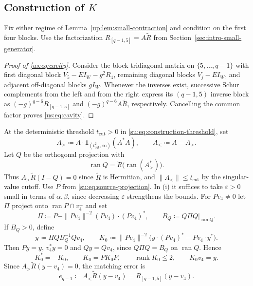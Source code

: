 \documentclass[11pt]{article}
\numberwithin{equation}{section}
\theoremstyle{remark}
\newcommand{\rank}{\operatorname{rank}}
\newcommand{\ran}{\operatorname{ran}}
\begin{document}
\subsection{Construction of \texorpdfstring{$K$}{K}}
\label{su:sec:generator-choice}
\label{su:sec:explicit-generator}

Fix either regime of Lemma~\ref{up:lem:small-contraction} and condition on
the first four blocks. Use the factorization
$R_{[q-1,5]}=A\widetilde R$ from Section~\ref{sec:intro-small-generator}.

\begin{proof}[Proof of \eqref{us:eq:cavity}]
Consider the block tridiagonal matrix on $\{5,\ldots,q-1\}$
with first diagonal block $V_5-EI_W-g^2R_4$, remaining diagonal
blocks $V_j-EI_W$, and adjacent off-diagonal blocks $gI_W$.
Whenever the inverses exist, successive Schur complements from
the left and from the right express its $(q-1,5)$ inverse block
as $(-g)^{q-6}R_{[q-1,5]}$ and
$(-g)^{q-6}A\widetilde R$, respectively.
Cancelling the common factor proves \eqref{us:eq:cavity}.
\end{proof}
At the deterministic threshold $t_{\mathrm{cut}}>0$ in
\eqref{su:eq:construction-threshold}, set
\[
 A_>\coloneqq A\cdot\mathbf1_{(t_{\mathrm{cut}}^2,\infty)}(A^*A),\qquad
 A_<\coloneqq A-A_>.
\]
Let $Q$ be the orthogonal projection with
\begin{equation}\label{su:eq:retained-projection}
 \ran Q=\widetilde R\bigl(\ran(A_>^*)\bigr).
\end{equation}
Thus $A_>\widetilde R(I-Q)=0$ since $\widetilde R$ is Hermitian,
and $\|A_<\|\le t_{\mathrm{cut}}$ by the singular-value cutoff.
Use $P$ from \eqref{su:eq:source-projection}.
In (i) it suffices to take $\varepsilon>0$ small in terms of
$\alpha,\beta$, since decreasing $\varepsilon$ strengthens the bounds.
For $Pv_4\ne0$ let $\Pi$ project onto $\ran P\cap v_4^\perp$ and set
\[
 \Pi\coloneqq P-\|Pv_4\|^{-2} (Pv_4)\cdot(Pv_4)^*,\qquad
 B_Q\coloneqq Q\Pi Q\big|_{\ran Q}.
\]
If $B_Q>0$, define
\begin{equation}
 y\coloneqq\Pi QB_Q^{-1}Qv_4,\qquad
 K_0\coloneqq\|Pv_4\|^{-2}\bigl(y\cdot(Pv_4)^*-Pv_4\cdot y^*\bigr).
 \label{us:eq:H0}
\end{equation}
Then $Py=y$, $v_4^*y=0$ and $Qy=Qv_4$, since $Q\Pi Q=B_Q$ on
$\ran Q$. Hence
\[
 K_0^*=-K_0,\qquad K_0=PK_0P,\qquad \rank K_0\le2,\qquad K_0v_4=y.
\]
Since $A_>\widetilde R(y-v_4)=0$, the matching error is
\begin{equation}\label{us:eq:error}
 e_{q-1}\coloneqq A_<\widetilde R(y-v_4)=R_{[q-1,5]}(y-v_4).
\end{equation}
\end{document}

